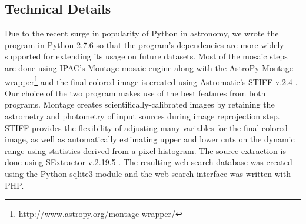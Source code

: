 \documentclass[5p]{elsarticle}
\begin{document}
		\subsection{Technical Details}
		Due to the recent surge in popularity of Python in astronomy, we wrote the program in Python 2.7.6 so that the program's dependencies are more widely supported for extending its usage on future datasets. Most of the mosaic steps are done using IPAC's Montage  \cite{montage} mosaic engine along with the AstroPy Montage wrapper\footnote{\url{http://www.astropy.org/montage-wrapper/}} and the final colored image is created using Astromatic's STIFF v.2.4 \cite{stiff}. Our choice of the two program makes use of the best features from both programs. Montage creates scientifically-calibrated images by retaining the astrometry and photometry of input sources during image reprojection step. STIFF provides the flexibility of adjusting many variables for the final colored image, as well as automatically estimating upper and lower cuts on the dynamic range using statistics derived from a pixel histogram.  %
The source extraction is done using SExtractor v.2.19.5 \cite{sextractor}. The resulting web search %
database was created using the Python sqlite3 module and the web search interface was written with PHP.
\end{document}
